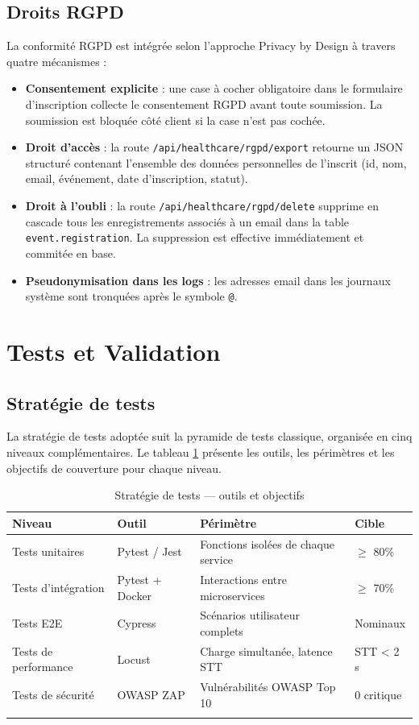 \subsection{Droits RGPD}
La conformité RGPD est intégrée selon l'approche Privacy by Design à travers quatre mécanismes :
\begin{itemize}
    \item \textbf{Consentement explicite} : une case à cocher obligatoire dans le formulaire d'inscription collecte le consentement RGPD avant toute soumission. La soumission est bloquée côté client si la case n'est pas cochée.
    \item \textbf{Droit d'accès} : la route \texttt{/api/healthcare/rgpd/export} retourne un JSON structuré contenant l'ensemble des données personnelles de l'inscrit (id, nom, email, événement, date d'inscription, statut).
    \item \textbf{Droit à l'oubli} : la route \texttt{/api/healthcare/rgpd/delete} supprime en cascade tous les enregistrements associés à un email dans la table \texttt{event.registration}. La suppression est effective immédiatement et commitée en base.
    \item \textbf{Pseudonymisation dans les logs} : les adresses email dans les journaux système sont tronquées après le symbole \texttt{@}.
\end{itemize}

\section{Tests et Validation}

\subsection{Stratégie de tests}
La stratégie de tests adoptée suit la pyramide de tests classique, organisée en cinq niveaux complémentaires. Le tableau \ref{tab:test_strategy} présente les outils, les périmètres et les objectifs de couverture pour chaque niveau.

\begin{longtable}{|m{3cm}|m{2.5cm}|m{4.5cm}|m{2.5cm}|}
\hline
\textbf{Niveau} & \textbf{Outil} & \textbf{Périmètre} & \textbf{Cible} \\
\hline
\endhead
\endfoot
\endlastfoot
\hline
Tests unitaires & Pytest / Jest & Fonctions isolées de chaque service & $\geq$ 80\% \\
\hline
Tests d'intégration & Pytest + Docker & Interactions entre microservices & $\geq$ 70\% \\
\hline
Tests E2E & Cypress & Scénarios utilisateur complets & Nominaux \\
\hline
Tests de performance & Locust & Charge simultanée, latence STT & STT < 2 s \\
\hline
Tests de sécurité & OWASP ZAP & Vulnérabilités OWASP Top 10 & 0 critique \\
\hline
\captionsetup{justification=centering,margin=2cm}
\caption{Stratégie de tests — outils et objectifs}
\label{tab:test_strategy}
\end{longtable}

